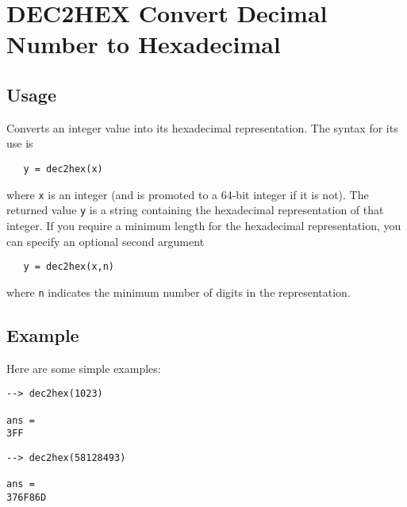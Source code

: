 \section{DEC2HEX Convert Decimal Number to Hexadecimal}

\subsection{Usage}

Converts an integer value into its hexadecimal representation.  The syntax
for its use is
\begin{verbatim}
   y = dec2hex(x)
\end{verbatim}
where \verb|x| is an integer (and is promoted to a 64-bit integer if it is not).
The returned value \verb|y| is a string containing the hexadecimal representation
of that integer.  If you require a minimum length for the hexadecimal
representation, you can specify an optional second argument
\begin{verbatim}
   y = dec2hex(x,n)
\end{verbatim}
where \verb|n| indicates the minimum number of digits in the representation.
\subsection{Example}

Here are some simple examples:
\begin{verbatim}
--> dec2hex(1023)

ans = 
3FF
\end{verbatim}
\begin{verbatim}
--> dec2hex(58128493)

ans = 
376F86D
\end{verbatim}
